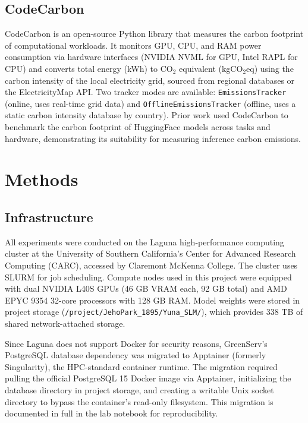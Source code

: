\documentclass[12pt]{article}
\begin{document}
\subsection{CodeCarbon}

CodeCarbon \cite{codecarbon2023} is an open-source Python library that
measures the carbon footprint of computational workloads. It monitors GPU,
CPU, and RAM power consumption via hardware interfaces (NVIDIA NVML for GPU,
Intel RAPL for CPU) and converts total energy (kWh) to CO$_2$ equivalent
(kgCO$_2$eq) using the carbon intensity of the local electricity grid,
sourced from regional databases or the ElectricityMap API. Two tracker
modes are available: \texttt{EmissionsTracker} (online, uses real-time grid
data) and \texttt{OfflineEmissionsTracker} (offline, uses a static carbon
intensity database by country). Prior work \cite{luccioni2023hf} used
CodeCarbon to benchmark the carbon footprint of HuggingFace models across
tasks and hardware, demonstrating its suitability for measuring inference
carbon emissions.

\section{Methods}

\subsection{Infrastructure}

All experiments were conducted on the Laguna high-performance computing
cluster at the University of Southern California's Center for Advanced
Research Computing (CARC), accessed by Claremont McKenna College. The
cluster uses SLURM for job scheduling. Compute nodes used in this project
were equipped with dual NVIDIA L40S GPUs (46 GB VRAM each, 92 GB total) and
AMD EPYC 9354 32-core processors with 128 GB RAM. Model weights were stored
in project storage (\texttt{/project/JehoPark\_1895/Yuna\_SLM/}), which
provides 338 TB of shared network-attached storage.

Since Laguna does not support Docker for security reasons, GreenServ's
PostgreSQL database dependency was migrated to Apptainer (formerly
Singularity), the HPC-standard container runtime. The migration required
pulling the official PostgreSQL 15 Docker image via Apptainer, initializing
the database directory in project storage, and creating a writable Unix
socket directory to bypass the container's read-only filesystem. This
migration is documented in full in the lab notebook for reproducibility.
\end{document}
